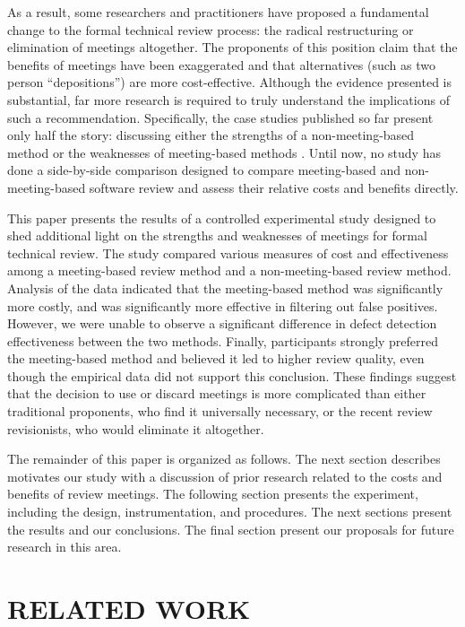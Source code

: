 As a result, some researchers and practitioners have proposed a fundamental
change to the formal technical review process: the radical restructuring or
elimination of meetings altogether.  The proponents of this position claim
that the benefits of meetings have been exaggerated and that alternatives
(such as two person ``depositions'') are more cost-effective.  Although the
evidence presented is substantial, far more research is required to truly
understand the implications of such a recommendation. Specifically, the
case studies published so far present only half the story: discussing
either the strengths of a non-meeting-based method \cite{Parnas85} or the
weaknesses of meeting-based methods \cite{Votta93}. Until now, no study has
done a side-by-side comparison designed to compare meeting-based and
non-meeting-based software review and assess their relative costs and
benefits directly.

This paper presents the results of a controlled experimental study designed
to shed additional light on the strengths and weaknesses of meetings for
formal technical review. The study compared various measures of cost and
effectiveness among a meeting-based review method and a non-meeting-based
review method.  Analysis of the data indicated that the meeting-based
method was significantly more costly, and was significantly more effective
in filtering out false positives.  However, we were unable to observe a
significant difference in defect detection effectiveness between the two
methods.  Finally, participants strongly preferred the meeting-based method
and believed it led to higher review quality, even though the empirical
data did not support this conclusion.  These findings suggest that 
the decision to use or discard meetings is more complicated than either 
traditional proponents, who find it universally necessary, or the 
recent review revisionists, who would eliminate it altogether.

The remainder of this paper is organized as follows.  The next section
describes motivates our study with a discussion of prior research related
to the costs and benefits of review meetings. The following section
presents the experiment, including the design, instrumentation, and
procedures. The next sections present the results and our conclusions. The
final section present our proposals for future research in this area.

\section{RELATED WORK} 

